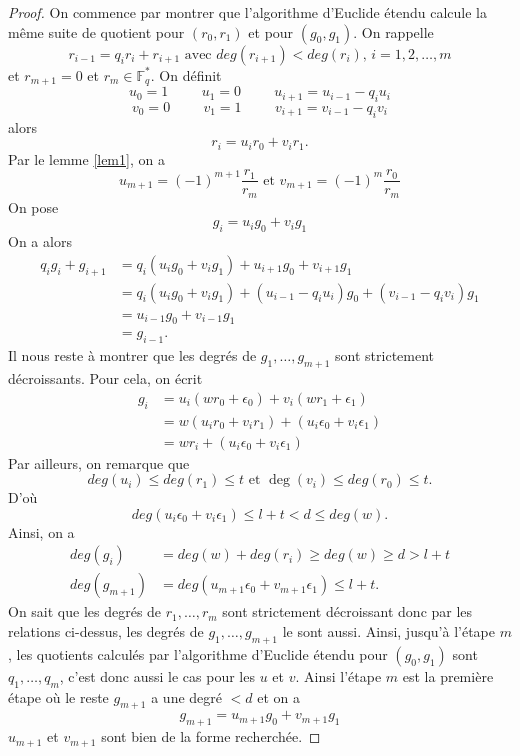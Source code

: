 \documentclass{article}
\theoremstyle{definition}
\theoremstyle{remark}
\begin{document}
\begin{proof}
    On commence par montrer que l'algorithme d'Euclide étendu calcule la même suite de quotient pour $(r_0, r_1)$ et pour $(g_0, g_1)$. On rappelle
    \[ r_{i-1} = q_i r_i + r_{i+1} \text{ avec } deg(r_{i+1}) < deg(r_i) \text{, } i = 1, 2, \dots, m \]
    et $r_{m+1} = 0$ et $r_m \in \mathbb{F}_{q}^*$. On définit
    \[ u_0 = 1 \hspace{1cm}  u_1 = 0 \hspace{1cm} u_{i+1} = u_{i-1} - q_i u_i \]
    \[ v_0 = 0 \hspace{1cm} v_1 = 1 \hspace{1cm} v_{i+1} = v_{i-1} - q_i v_i \]
    alors
    \[ r_i = u_i r_0 + v_i r_1. \]
    Par le lemme \ref{lem1}, on a
    \[ u_{m+1} = (-1)^{m+1} \frac{r_1}{r_m} \text{ et } v_{m+1} = (-1)^{m} \frac{r_0}{r_m} \]
    On pose
    \[ g_i = u_i g_0 + v_i g_1 \]
    On a alors
    \begin{align*}
        q_i g_i + g_{i+1} &= q_i (u_i g_0 + v_i g_1) + u_{i+1} g_0 + v_{i+1} g_1 \\
        &= q_i (u_i g_0 + v_i g_1) + (u_{i-1} - q_i u_i) g_0 + (v_{i-1} - q_i v_i) g_1 \\
        &= u_{i-1} g_0 + v_{i-1} g_1 \\
        &= g_{i-1}.
    \end{align*}
    Il nous reste à montrer que les degrés de $g_1, \dots, g_{m+1}$ sont strictement décroissants. 
    Pour cela, on écrit
    \begin{align*}
        g_i &= u_i(w r_0 + \epsilon_0) + v_i(w r_1 + \epsilon_1) \\
        &= w (u_i r_0 + v_i r_1) + (u_i \epsilon_0 + v_i \epsilon_1) \\
        &= w r_i + (u_i \epsilon_0 + v_i \epsilon_1) 
    \end{align*} 
    Par ailleurs, on remarque que
    \[ deg(u_i) \le deg(r_1) \le t \text{ et } \deg(v_i) \le deg(r_0) \le t. \]
    D'où
    \[ deg(u_i \epsilon_0 + v_i \epsilon_1) \le l + t < d \le deg(w). \]
    Ainsi, on a
    \begin{align*}
        deg(g_i) &= deg(w) + deg(r_i) \ge deg(w) \ge d > l + t \\
        deg(g_{m+1}) &= deg(u_{m+1} \epsilon_0 + v_{m+1} \epsilon_1) \le l + t.
    \end{align*}
    On sait que les degrés de $r_1, \dots, r_m$ sont strictement décroissant donc par les relations ci-dessus, les degrés de $g_1, \dots, g_{m+1}$ le sont aussi. Ainsi, jusqu'à l'étape $m$, les quotients calculés par l'algorithme d'Euclide étendu pour $(g_0, g_1)$ sont $q_1, \dots, q_m$, c'est donc aussi le cas pour les $u$ et $v$. Ainsi l'étape $m$ est la première étape où le reste $g_{m+1}$ a une degré $<d$ et on a
    \[ g_{m+1} = u_{m+1} g_0 + v_{m+1} g_1 \]
    $u_{m+1}$ et $v_{m+1}$ sont bien de la forme recherchée.
\end{proof}
\end{document}
